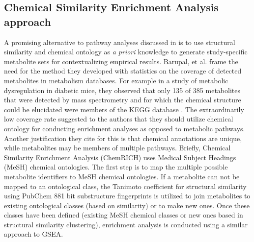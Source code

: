 \begin{DoubleSpace*}
\section{Chemical Similarity Enrichment Analysis approach}
A promising alternative to pathway analyses discussed in \cite{barupal2017} is to use structural similarity and chemical ontology as \emph{a priori} knowledge to generate study-specific metabolite sets for contextualizing empirical results. Barupal, et al. frame the need for the method they developed with statistics on the coverage of detected metabolites in metabolism databases. For example in a study of metabolic dysregulation in diabetic mice, they observed that only 135 of 385 metabolites that were detected by mass spectrometry and for which the chemical structure could be elucidated were members of the KEGG database \cite{kanehisa2016}. The extraordinarily low coverage rate suggested to the authors that they should utilize chemical ontology for conducting enrichment analyses as opposed to metabolic pathways. Another justification they cite for this is that chemical annotations are unique, while metabolites may be members of multiple pathways. Briefly, Chemical Similarity Enrichment Analysis (ChemRICH) uses Medical Subject Headings (MeSH) chemical ontologies. The first step is to map the multiple possible metabolite identifiers to MeSH chemical ontologies. If a metabolite can not be mapped to an ontological class, the Tanimoto coefficient for structural similarity using PubChem 881 bit substructure fingerprints is utilized to join metabolites to existing ontological classes (based on similarity) or to make new ones. Once these classes have been defined (existing MeSH chemical classes or new ones based in structural similarity clustering), enrichment analysis is conducted using a similar approach to GSEA. 


\end{DoubleSpace*}

